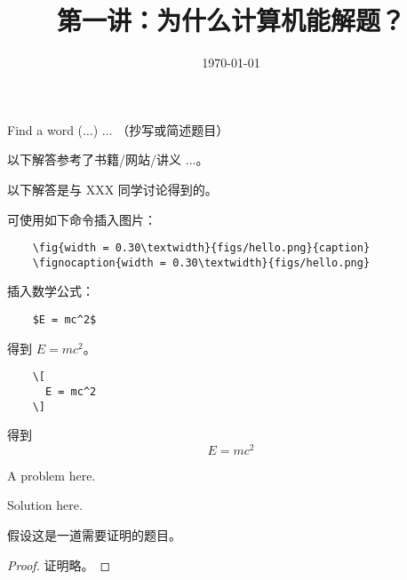 \documentclass[11pt, a4paper, UTF8]{ctexart}
\title{第一讲：为什么计算机能解题？}
\date{\today}     %
\begin{document}
\maketitle
\noplagiarism	%
\beginthishw	%

\begin{problem}[UD: 1.2]	%
  Find a word ($\ldots$) $\ldots$ （抄写或简述题目）
\end{problem}

\begin{remark}	%
  以下解答参考了书籍/网站/讲义 $\ldots$。

  \noindent 以下解答是与 XXX 同学讨论得到的。
\end{remark}

\begin{solution}
  可使用如下命令插入图片：
  \begin{verbatim}
    \fig{width = 0.30\textwidth}{figs/hello.png}{caption}
    \fignocaption{width = 0.30\textwidth}{figs/hello.png}
  \end{verbatim}
  插入数学公式：
  \begin{verbatim}
    $E = mc^2$
  \end{verbatim}
  得到 $E = mc^2$。
  \begin{verbatim}
    \[
      E = mc^2
    \]
  \end{verbatim}
  得到
  \[
    E = mc^2
  \]
\end{solution}

\begin{problem}[UD: 1.3]
  A problem here.
\end{problem}

\begin{solution}
  Solution here.
\end{solution}
\begin{problem}[UD: x.x]
  假设这是一道需要证明的题目。	
\end{problem}


\begin{proof}
  证明略。	
\end{proof}
\begincorrection	%
\end{document}
